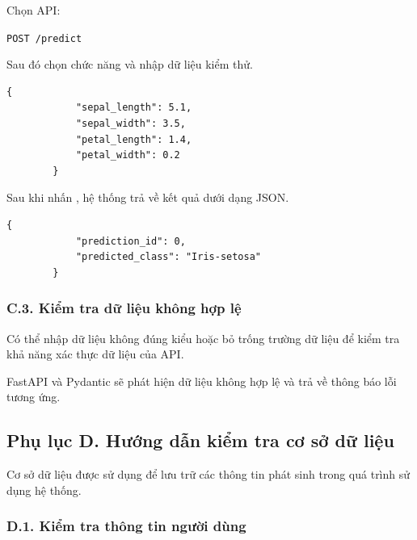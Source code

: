 \documentclass[14pt]{extarticle}
\begin{document}
	\noindent
	Chọn API:
	
	\begin{center}
		\texttt{POST /predict}
	\end{center}
	
	\noindent
	Sau đó chọn chức năng  và nhập dữ liệu kiểm thử.
	
	\begin{lstlisting}[numbers=none,
		frame=single,
		basicstyle=\ttfamily\small]
		{
			"sepal_length": 5.1,
			"sepal_width": 3.5,
			"petal_length": 1.4,
			"petal_width": 0.2
		}
	\end{lstlisting}
	
	\noindent
	Sau khi nhấn , hệ thống trả về kết quả dưới dạng JSON.
	
	\begin{lstlisting}[numbers=none,
		frame=single,
		basicstyle=\ttfamily\small]
		{
			"prediction_id": 0,
			"predicted_class": "Iris-setosa"
		}
	\end{lstlisting}
	
	
	\subsubsection*{C.3. Kiểm tra dữ liệu không hợp lệ}
	
	\noindent
	Có thể nhập dữ liệu không đúng kiểu hoặc bỏ trống trường dữ liệu để
	kiểm tra khả năng xác thực dữ liệu của API.
	
	\noindent
	FastAPI và Pydantic sẽ phát hiện dữ liệu không hợp lệ và trả về thông
	báo lỗi tương ứng.
	
	
	
	\newpage
	\subsection*{Phụ lục D. Hướng dẫn kiểm tra cơ sở dữ liệu}
	
	\noindent
	Cơ sở dữ liệu được sử dụng để lưu trữ các thông tin phát sinh trong quá
	trình sử dụng hệ thống.
	
	\subsubsection*{D.1. Kiểm tra thông tin người dùng}
	
\end{document}
